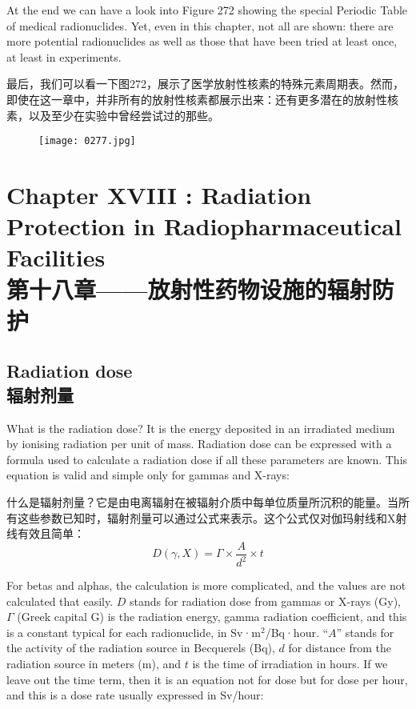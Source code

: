 \documentclass[dvipsnames, svgnames,a4paper,11pt]{article}
\begin{document}
\newpage

At the end we can have a look into Figure 272 showing the special Periodic Table of medical radionuclides. Yet, even in this chapter, not all are shown: there are more potential radionuclides as well as those that have been tried at least once, at least in experiments.

最后，我们可以看一下图272，展示了医学放射性核素的特殊元素周期表。然而，即使在这一章中，并非所有的放射性核素都展示出来：还有更多潜在的放射性核素，以及至少在实验中曾经尝试过的那些。


\begin{figure}[h]
	\centering
    \texttt{[image: 0277.jpg]}  
     \label{fig372}
\end{figure}

\newpage

\section{Chapter XVIII :   Radiation Protection in Radiopharmaceutical Facilities\\第十八章——放射性药物设施的辐射防护}
\subsection{Radiation dose \\ 辐射剂量}  
What is the radiation dose? It is the energy deposited in an irradiated medium by ionising radiation per unit of mass. Radiation dose can be expressed with a formula used to calculate a radiation dose if all these parameters are known. This equation is valid and simple only for gammas and X-rays:

什么是辐射剂量？它是由电离辐射在被辐射介质中每单位质量所沉积的能量。当所有这些参数已知时，辐射剂量可以通过公式来表示。这个公式仅对伽玛射线和X射线有效且简单：
\[
D(\gamma, X) = \Gamma \times \frac{A}{d^{2}} \times t
\]

For betas and alphas, the calculation is more complicated, and the values are not calculated that easily. \(D\) stands for radiation dose from gammas or X-rays (Gy), \(\Gamma\) (Greek capital G) is the radiation energy, gamma radiation coefficient, and this is a constant typical for each radionuclide, in Sv·m\(^2\)/Bq·hour. “\(A\)” stands for the activity of the radiation source in Becquerels (Bq), \(d\) for distance from the radiation source in meters (m), and \(t\) is the time of irradiation in hours. If we leave out the time term, then it is an equation not for dose but for dose per hour, and this is a dose rate usually expressed in Sv/hour:
\end{document}
